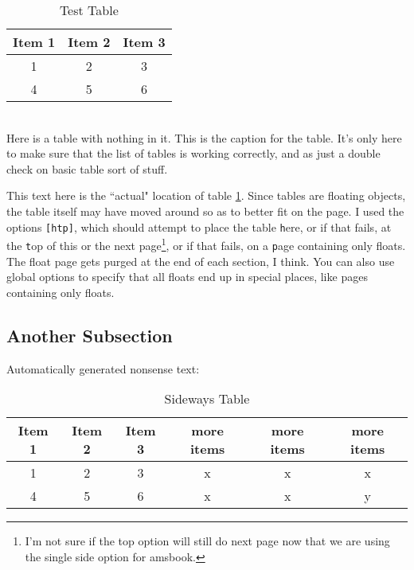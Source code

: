 \documentclass[draft]{csuthesis} %
\begin{document}
\begin{table}[htp]
\caption{Test Table \label{table:faketable}}
\begin{tabular}{|c|c|c|}
\hline
Item 1 & Item 2 & Item 3\\
\hline
1 & 2 & 3 \\
4 & 5 & 6 \\
\hline
\end{tabular}
\begin{minipage}{0.9\textwidth} ~\\ \footnotesize
Here is a table with nothing in it.  This is the caption for the table.  It's only here to make sure that the list of tables is working correctly, and as just a double check on basic table sort of stuff.
\end{minipage}%
\end{table}

This text here is the ``actual" location of table \ref{table:faketable}.  Since tables are floating objects, the table itself may have moved around so as to better fit on the page.  I used the options \verb-[htp]-, which should attempt to place the table \verb-h-ere, or if that fails, at the \verb-t-op of this or the next page\footnote{I'm not sure if the top option will still do next page now that we are using the single side option for amsbook.}, or if that fails, on a \verb-p-age containing only floats.  The float page gets purged at the end of each section, I think.  You can also use global options to specify that all floats end up in special places, like pages containing only floats.

\subsection{Another Subsection}

Automatically generated nonsense text: \lipsum[3-5]

\begin{sidewayspage}
\begin{table}[h]
\caption{Sideways Table \label{table:sidetable}}
\begin{tabular}{|c|c|c|ccc|}
\hline
Item 1 & Item 2 & Item 3 & more items & more items & more items\\
\hline
\hline
1 & 2 & 3 & x & x & x\\
4 & 5 & 6 & x & x & y\\
\hline
\end{tabular}
\end{table}
\end{sidewayspage}
\end{document}
